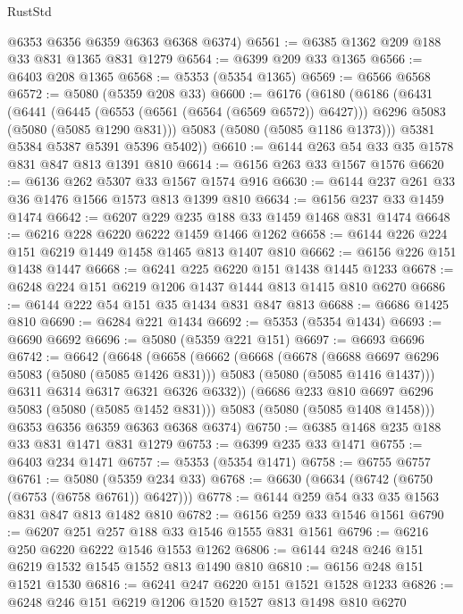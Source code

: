 \begin{lexlean}{RustStd}
\begin{coremodule}
{\begin{coremodule}
{{{{{      @6353
      @6356
      @6359
      @6363
      @6368
      @6374)
@6561 := @6385 @1362 @209 @188 @33 @831 @1365 @831 @1279
@6564 := @6399 @209 @33 @1365
@6566 := @6403 @208 @1365
@6568 := @5353 (@5354 @1365)
@6569 := @6566 @6568
@6572 := @5080 (@5359 @208 @33)
@6600 := @6176
    (@6180
      (@6186
        (@6431
          (@6441
            (@6445 (@6553 (@6561 (@6564 (@6569 @6572)) @6427)))
            @6296
            @5083
            (@5080 (@5085 @1290 @831)))
          @5083
          (@5080 (@5085 @1186 @1373)))
        @5381
        @5384
        @5387
        @5391
        @5396
        @5402))
@6610 := @6144 @263 @54 @33 @35 @1578 @831 @847 @813 @1391 @810
@6614 := @6156 @263 @33 @1567 @1576
@6620 := @6136 @262 @5307 @33 @1567 @1574 @916
@6630 := @6144 @237 @261 @33 @36 @1476 @1566 @1573 @813 @1399 @810
@6634 := @6156 @237 @33 @1459 @1474
@6642 := @6207 @229 @235 @188 @33 @1459 @1468 @831 @1474
@6648 := @6216 @228 @6220 @6222 @1459 @1466 @1262
@6658 := @6144 @226 @224 @151 @6219 @1449 @1458 @1465 @813 @1407 @810
@6662 := @6156 @226 @151 @1438 @1447
@6668 := @6241 @225 @6220 @151 @1438 @1445 @1233
@6678 := @6248 @224 @151 @6219 @1206 @1437 @1444 @813 @1415 @810 @6270
@6686 := @6144 @222 @54 @151 @35 @1434 @831 @847 @813
@6688 := @6686 @1425 @810
@6690 := @6284 @221 @1434
@6692 := @5353 (@5354 @1434)
@6693 := @6690 @6692
@6696 := @5080 (@5359 @221 @151)
@6697 := @6693 @6696
@6742 := @6642
    (@6648
      (@6658
        (@6662
          (@6668
            (@6678
              (@6688 @6697 @6296 @5083 (@5080 (@5085 @1426 @831)))
              @5083
              (@5080 (@5085 @1416 @1437)))
            @6311
            @6314
            @6317
            @6321
            @6326
            @6332))
        (@6686 @233 @810 @6697 @6296 @5083 (@5080 (@5085 @1452 @831)))
        @5083
        (@5080 (@5085 @1408 @1458)))
      @6353
      @6356
      @6359
      @6363
      @6368
      @6374)
@6750 := @6385 @1468 @235 @188 @33 @831 @1471 @831 @1279
@6753 := @6399 @235 @33 @1471
@6755 := @6403 @234 @1471
@6757 := @5353 (@5354 @1471)
@6758 := @6755 @6757
@6761 := @5080 (@5359 @234 @33)
@6768 := @6630 (@6634 (@6742 (@6750 (@6753 (@6758 @6761)) @6427)))
@6778 := @6144 @259 @54 @33 @35 @1563 @831 @847 @813 @1482 @810
@6782 := @6156 @259 @33 @1546 @1561
@6790 := @6207 @251 @257 @188 @33 @1546 @1555 @831 @1561
@6796 := @6216 @250 @6220 @6222 @1546 @1553 @1262
@6806 := @6144 @248 @246 @151 @6219 @1532 @1545 @1552 @813 @1490 @810
@6810 := @6156 @248 @151 @1521 @1530
@6816 := @6241 @247 @6220 @151 @1521 @1528 @1233
@6826 := @6248 @246 @151 @6219 @1206 @1520 @1527 @813 @1498 @810 @6270
}}}}}
\end{coremodule}}
\end{coremodule}
\end{lexlean}
